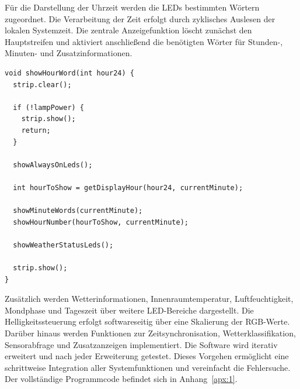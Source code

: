 Für die Darstellung der Uhrzeit werden die LEDs bestimmten Wörtern zugeordnet.  
Die Verarbeitung der Zeit erfolgt durch zyklisches Auslesen der lokalen Systemzeit.  
Die zentrale Anzeigefunktion löscht zunächst den Hauptstreifen und aktiviert anschließend die benötigten Wörter für Stunden-, Minuten- und Zusatzinformationen.

\begin{lstlisting}[style=arduino,caption={Zentrale Anzeigefunktion der Wortuhr}]
void showHourWord(int hour24) {
  strip.clear();

  if (!lampPower) {
    strip.show();
    return;
  }

  showAlwaysOnLeds();

  int hourToShow = getDisplayHour(hour24, currentMinute);

  showMinuteWords(currentMinute);
  showHourNumber(hourToShow, currentMinute);

  showWeatherStatusLeds();

  strip.show();
}
\end{lstlisting}

Zusätzlich werden Wetterinformationen, Innenraumtemperatur, Luftfeuchtigkeit, Mondphase und Tageszeit über weitere LED-Bereiche dargestellt.  
Die Helligkeitssteuerung erfolgt softwareseitig über eine Skalierung der RGB-Werte.  
Darüber hinaus werden Funktionen zur Zeitsynchronisation, Wetterklassifikation, Sensorabfrage und Zusatzanzeigen implementiert.
Die Software wird iterativ erweitert und nach jeder Erweiterung getestet.  
Dieses Vorgehen ermöglicht eine schrittweise Integration aller Systemfunktionen und vereinfacht die Fehlersuche.
Der vollständige Programmcode befindet sich in Anhang~\ref{apx:1}.

